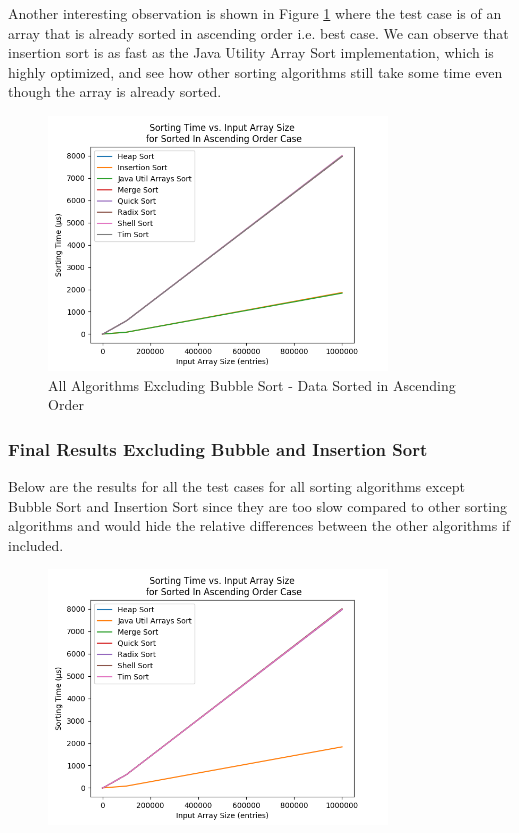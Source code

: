 Another interesting observation is shown in Figure \ref{fig:allButBubbleInAscendingOrder} where the test case is of an array that is already sorted in ascending order i.e. best case. We can observe that insertion sort is as fast as the Java Utility Array Sort implementation, which is highly optimized, and see how other sorting algorithms still take some time even though the array is already sorted.

\begin{figure}[H]
\centering
\includegraphics[width=9cm]{figures/plots_without_BubbleSort/sorting_time_vs_input_array_size_SortedInAscendingOrderCase.png}
\caption{All Algorithms Excluding Bubble Sort - Data Sorted in Ascending Order}
\label{fig:allButBubbleInAscendingOrder}
\end{figure}

\subsubsection{Final Results Excluding Bubble and Insertion Sort}

Below are the results for all the test cases for all sorting algorithms except Bubble Sort and Insertion Sort since they are too slow compared to other sorting algorithms and would hide the relative differences between the other algorithms if included.

\begin{figure}[!htp]
\centering
\includegraphics[width=9cm]{figures/plots_without_BubbleSort_InsertionSort/sorting_time_vs_input_array_size_SortedInAscendingOrderCase.png}
\end{figure}

